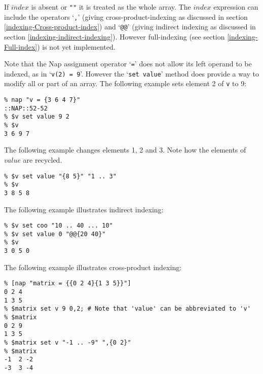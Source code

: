 If 
  $index$ is absent or 
  \texttt{""} it is treated as the whole array. 
The $index$ expression can include the operators `\texttt{,}' (giving 
{cross-product-indexing} as discussed in section \ref{indexing-Cross-product-index})
  and `\texttt{@@}' (giving 
{indirect indexing} as discussed in section \ref{indexing-indirect-indexing}).
  However {full-indexing} (see section \ref{indexing-Full-index}) is not yet implemented.
  

Note that the Nap assignment operator `\texttt{=}' does not allow its left operand to be indexed,
  as in `\texttt{v(2) = 9}'. However the `\texttt{set value}' method does provide a way to modify all
  or part of an array. The following example sets element 2 of 
  \texttt{v} to 9:
  \begin{verbatim}
% nap "v = {3 6 4 7}"
::NAP::52-52
% $v set value 9 2
% $v
3 6 9 7
\end{verbatim}

  

The following example changes elements 1, 2 and 3. Note how the
  elements of 
  $value$ are recycled.
  \begin{verbatim}
% $v set value "{8 5}" "1 .. 3"
% $v
3 8 5 8
\end{verbatim}

  

The following example illustrates indirect indexing:
  \begin{verbatim}
% $v set coo "10 .. 40 ... 10"
% $v set value 0 "@@{20 40}"
% $v
3 0 5 0
\end{verbatim}

  

The following example illustrates cross-product indexing:
  \begin{verbatim}
% [nap "matrix = {{0 2 4}{1 3 5}}"]
0 2 4
1 3 5
% $matrix set v 9 0,2; # Note that 'value' can be abbreviated to 'v'
% $matrix
0 2 9
1 3 5
% $matrix set v "-1 .. -9" ",{0 2}"
% $matrix
-1  2 -2
-3  3 -4
\end{verbatim}

